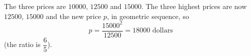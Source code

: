 The three prices are $10000$, $12500$ and $15000$. The three highest prices are now $12500$, $15000$ and the new price $p$, in geometric sequence, so
\[p=\dfrac{15000^2}{12500}=\boxed{18000\text{ dollars}}\]
(the ratio is $\dfrac65$).

